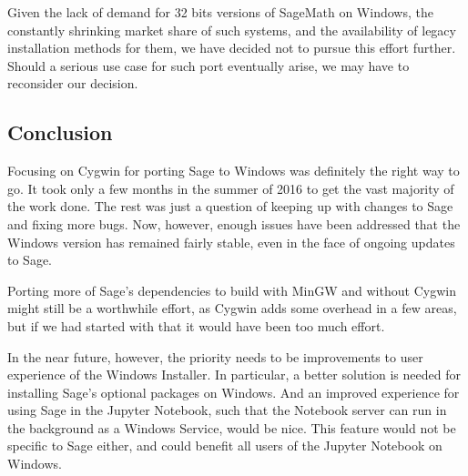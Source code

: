 Given the lack of demand for 32 bits versions of SageMath on Windows,
the constantly shrinking market share of such systems, and the
availability of legacy installation methods for them, we have decided
not to pursue this effort further. Should a serious use case for such
port eventually arise, we may have to reconsider our decision.

\hypertarget{conclusion}{%
\subsection{Conclusion}\label{conclusion}}

Focusing on Cygwin for porting Sage to Windows was definitely the right
way to go. It took only a few months in the summer of 2016 to get the
vast majority of the work done. The rest was just a question of keeping
up with changes to Sage and fixing more bugs. Now, however, enough
issues have been addressed that the Windows version has remained fairly
stable, even in the face of ongoing updates to Sage.

Porting more of Sage's dependencies to build with MinGW and without
Cygwin might still be a worthwhile effort, as Cygwin adds some overhead
in a few areas, but if we had started with that it would have been too
much effort.

In the near future, however, the priority needs to be improvements to
user experience of the Windows Installer. In particular, a better
solution is needed for installing Sage's optional packages on Windows.
And an improved experience for using Sage in the Jupyter Notebook, such
that the Notebook server can run in the background as a Windows Service,
would be nice. This feature would not be specific to Sage either, and
could benefit all users of the Jupyter Notebook on Windows.
